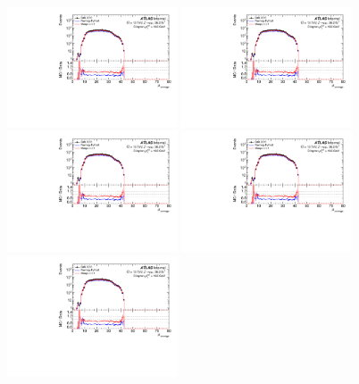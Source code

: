 \begin{figure}[h!]
  \centering
  \includegraphics[page=84,width=0.45\textwidth]{figures/ZjetOmnifoldMCDataComp.pdf}
  \includegraphics[page=100,width=0.45\textwidth]{figures/ZjetOmnifoldMCDataComp.pdf} \\
  \includegraphics[page=104,width=0.45\textwidth]{figures/ZjetOmnifoldMCDataComp.pdf}
    \includegraphics[page=116,width=0.45\textwidth]{figures/ZjetOmnifoldMCDataComp.pdf}\\
  \includegraphics[page=108,width=0.45\textwidth]{figures/ZjetOmnifoldMCDataComp.pdf}

\end{figure}
